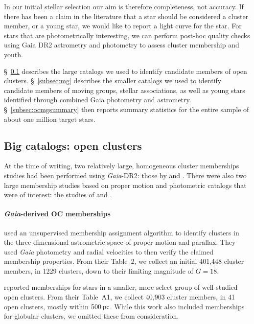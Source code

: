 \documentclass[12pt,twocolumn,tighten]{aastex62}
\begin{document}
In our initial stellar selection our aim is therefore completeness, not 
accuracy.  If there has
been a claim in the literature that a star should be considered a
cluster member, or a young star, we would like to report a light curve for the 
star.
For stars that are photometrically interesting, we can perform post-hoc
quality checks using Gaia DR2 astrometry and photometry to assess cluster 
membership and youth.

\S~\ref{subsec:oc} describes the large catalogs we used to 
identify candidate members of open clusters.
\S~\ref{subsec:mg} describes the smaller catalogs we used to identify 
candidate members of moving groups, stellar associations, as well as young 
stars identified through combined Gaia photometry and astrometry.
\S~\ref{subsec:ocmgsummary} then reports summary statistics for the entire 
sample of about one million target stars.


\subsection{Big catalogs: open clusters}
\label{subsec:oc}

At the time of writing, two relatively large, homogeneous cluster
memberships studies had been performed using {\it Gaia}-DR2: those by
\citet{cantat-gaudin_gaia_2018} and \citet{gaia_hr_2018}.
There were also two large membership studies based on proper motion and 
photometric catalogs that were of interest: the studies of
\citet{Kharchenko_et_al_2013} and \citet{dias_proper_2014}.

\paragraph{{\it Gaia}-derived OC memberships}

\citet{cantat-gaudin_gaia_2018} used an unsupervised membership
assignment algorithm to identify clusters in the three-dimensional
astrometric space of proper motion and parallax. They used {\it Gaia}
photometry and radial velocities to then verify the claimed
membership properties.  From their Table~2, we collect an initial 401{,}448
cluster members, in 1229 clusters, down to their limiting magnitude of
$G=18$.

\citet{gaia_hr_2018} reported memberships for stars in a smaller, more
select group of well-studied open clusters. From their Table~A1, we
collect 40{,}903 cluster members, in 41 open clusters, mostly within
$500\,{\rm pc}$. While this work also included memberships for
globular clusters, we omitted these from consideration.
\end{document}
